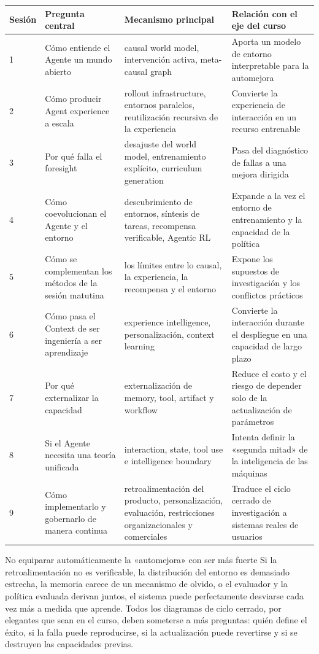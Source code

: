 \begin{longtable}{p{}p{}p{}p{}}
\toprule
Sesión & Pregunta central & Mecanismo principal & Relación con el eje del curso \\
\midrule
1 & Cómo entiende el Agente un mundo abierto & causal world model, intervención activa, meta-causal graph & Aporta un modelo de entorno interpretable para la automejora \\
2 & Cómo producir Agent experience a escala & rollout infrastructure, entornos paralelos, reutilización recursiva de la experiencia & Convierte la experiencia de interacción en un recurso entrenable \\
3 & Por qué falla el foresight & desajuste del world model, entrenamiento explícito, curriculum generation & Pasa del diagnóstico de fallas a una mejora dirigida \\
4 & Cómo coevolucionan el Agente y el entorno & descubrimiento de entornos, síntesis de tareas, recompensa verificable, Agentic RL & Expande a la vez el entorno de entrenamiento y la capacidad de la política \\
5 & Cómo se complementan los métodos de la sesión matutina & los límites entre lo causal, la experiencia, la recompensa y el entorno & Expone los supuestos de investigación y los conflictos prácticos \\
6 & Cómo pasa el Context de ser ingeniería a ser aprendizaje & experience intelligence, personalización, context learning & Convierte la interacción durante el despliegue en una capacidad de largo plazo \\
7 & Por qué externalizar la capacidad & externalización de memory, tool, artifact y workflow & Reduce el costo y el riesgo de depender solo de la actualización de parámetros \\
8 & Si el Agente necesita una teoría unificada & interaction, state, tool use e intelligence boundary & Intenta definir la «segunda mitad» de la inteligencia de las máquinas \\
9 & Cómo implementarlo y gobernarlo de manera continua & retroalimentación del producto, personalización, evaluación, restricciones organizacionales y comerciales & Traduce el ciclo cerrado de investigación a sistemas reales de usuarios \\
\bottomrule
\end{longtable}

\begin{warningbox}{No equiparar automáticamente la «automejora» con ser más fuerte}
Si la retroalimentación no es verificable, la distribución del entorno es demasiado estrecha, la memoria carece de un mecanismo de olvido, o el evaluador y la política evaluada derivan juntos, el sistema puede perfectamente desviarse cada vez más a medida que aprende. Todos los diagramas de ciclo cerrado, por elegantes que sean en el curso, deben someterse a más preguntas: quién define el éxito, si la falla puede reproducirse, si la actualización puede revertirse y si se destruyen las capacidades previas.
\end{warningbox}

